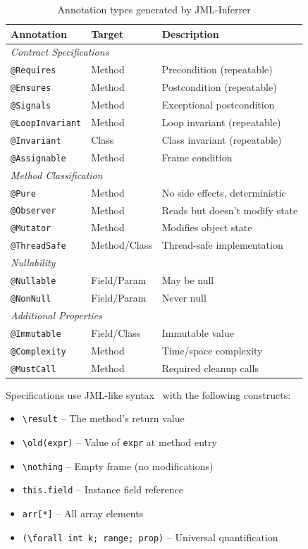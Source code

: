 \documentclass[11pt]{article}
\begin{document}
\begin{table}[ht]
\centering
\caption{Annotation types generated by JML-Inferrer}
\label{tab:annotation-types}
\small
\begin{tabular}{lll}
\toprule
\textbf{Annotation} & \textbf{Target} & \textbf{Description} \\
\midrule
\multicolumn{3}{l}{\textit{Contract Specifications}} \\
\texttt{@Requires} & Method & Precondition (repeatable) \\
\texttt{@Ensures} & Method & Postcondition (repeatable) \\
\texttt{@Signals} & Method & Exceptional postcondition \\
\texttt{@LoopInvariant} & Method & Loop invariant (repeatable) \\
\texttt{@Invariant} & Class & Class invariant (repeatable) \\
\texttt{@Assignable} & Method & Frame condition \\
\midrule
\multicolumn{3}{l}{\textit{Method Classification}} \\
\texttt{@Pure} & Method & No side effects, deterministic \\
\texttt{@Observer} & Method & Reads but doesn't modify state \\
\texttt{@Mutator} & Method & Modifies object state \\
\texttt{@ThreadSafe} & Method/Class & Thread-safe implementation \\
\midrule
\multicolumn{3}{l}{\textit{Nullability}} \\
\texttt{@Nullable} & Field/Param & May be null \\
\texttt{@NonNull} & Field/Param & Never null \\
\midrule
\multicolumn{3}{l}{\textit{Additional Properties}} \\
\texttt{@Immutable} & Field/Class & Immutable value \\
\texttt{@Complexity} & Method & Time/space complexity \\
\texttt{@MustCall} & Method & Required cleanup calls \\
\bottomrule
\end{tabular}
\end{table}

Specifications use JML-like syntax~\cite{leavens2006design, chalin2010jml} with the following constructs:
\begin{itemize}
    \item \texttt{\textbackslash result} -- The method's return value
    \item \texttt{\textbackslash old(expr)} -- Value of \texttt{expr} at method entry
    \item \texttt{\textbackslash nothing} -- Empty frame (no modifications)
    \item \texttt{this.field} -- Instance field reference
    \item \texttt{arr[*]} -- All array elements
    \item \texttt{(\textbackslash forall int k; range; prop)} -- Universal quantification
\end{itemize}
\end{document}
